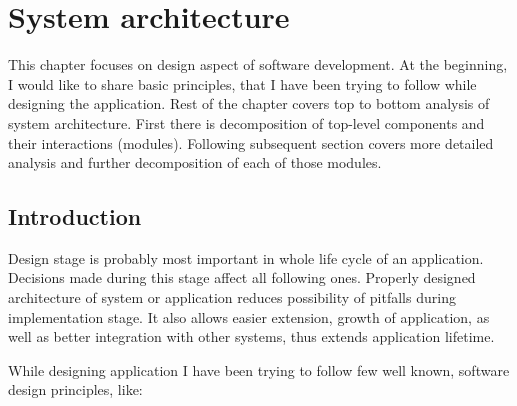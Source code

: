%


\chapter{System architecture}
\label{cha:sys_arch}

\parbox{0.8\textwidth}{

{\small
This chapter focuses on design aspect of software development. At the beginning, I would like to share basic principles, that I have been trying to follow while designing the application. Rest of the chapter covers top to bottom analysis of system architecture. First there is decomposition of top-level components and their interactions (modules). Following subsequent section covers more detailed analysis and further decomposition of each of those modules.
}
}

\section{Introduction}
\label{sec:gui}

Design stage is probably most important in whole life cycle of an application. Decisions made during this stage affect all following ones. Properly designed architecture of system or application reduces possibility of pitfalls during implementation stage. It also allows easier extension, growth of application, as well as better integration with other systems, thus extends application lifetime. 

While designing application I have been trying to follow few well known, software design principles, like:


